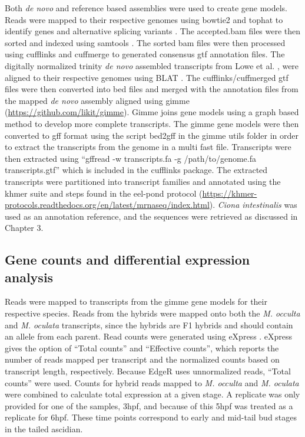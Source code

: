 Both \textit{de novo} and reference based assemblies were used to create gene models. Reads were mapped to their respective genomes using bowtie2 and tophat to identify genes and alternative splicing variants \cite{langmead_fast_2012,trapnell_differential_2012}. The accepted.bam files were then sorted and indexed using samtools \cite{li_sequence_2009}. The sorted bam files were then processed using cufflinks and cuffmerge to generated consensus gtf annotation files. The digitally normalized trinity \textit{de novo} assembled transcripts from Lowe et al. \cite{lowe_evaluating_2014}, were aligned to their respective genomes using BLAT \cite{haas_novo_2013}. The cufflinks/cuffmerged gtf files were then converted into bed files and merged with the annotation files from the mapped \textit{de novo} assembly aligned using gimme (\url{https://github.com/likit/gimme}). Gimme joins gene models using a graph based method to develop more complete transcripts. The gimme gene models were then converted to gff format using the script bed2gff in the gimme utils folder in order to extract the transcripts from the genome in a multi fast file. Transcripts were then extracted using ``gffread -w transcripts.fa -g /path/to/genome.fa transcripts.gtf'' which is included in the cufflinks package. The extracted transcripts were partitioned into transcript families and annotated using the khmer suite and steps found in the eel-pond protocol (\url{https://khmer-protocols.readthedocs.org/en/latest/mrnaseq/index.html}). \textit{Ciona intestinalis} was used as an annotation reference, and the sequences were retrieved as discussed in Chapter 3. 

\subsection{Gene counts and differential expression analysis}
Reads were mapped to transcripts from the gimme gene models for their respective species. Reads from the hybrids were mapped onto both the \textit{M. occulta} and \textit{M. oculata} transcripts, since the hybrids are F1 hybrids and should contain an allele from each parent. Read counts were generated using eXpress \cite{roberts_streaming_2013}. eXpress gives the option of ``Total counts'' and ``Effective counts'', which reports the number of reads mapped per transcript and the normalized counts based on transcript length, respectively. Because EdgeR uses unnormalized reads, ``Total counts'' were used. Counts for hybrid reads mapped to \textit{M. occulta} and \textit{M. oculata} were combined to calculate total expression at a given stage. A replicate was only provided for one of the samples, 3hpf, and because of this 5hpf was treated as a replicate for 6hpf. These time points correspond to early and mid-tail bud stages in the tailed ascidian. 

